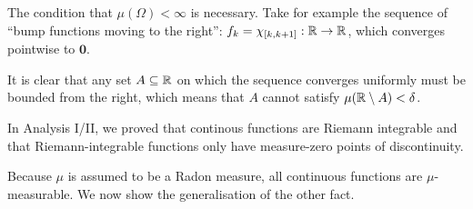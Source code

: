\begin{rem}[] \label{rem:egoroff-finite-necessary}
  The condition that $\mu(\Omega) < \infty$ is necessary.
Take for example the sequence of ``bump functions moving to the right'':
$f_k = \chi_{[k,k+1]}:\mathbb{R} \to \mathbb{R}$, which converges pointwise to $\bm{0}$.

It is clear that any set $A \subseteq \mathbb{R}$ on which the sequence converges uniformly must be bounded from the right, which means that $A$ cannot satisfy $\mu(\mathbb{R} \setminus A) < \delta$.
\end{rem}

In Analysis I/II, we proved that continous functions are Riemann integrable and that Riemann-integrable functions only have measure-zero points of discontinuity.

Because $\mu$ is assumed to be a Radon measure, all continuous functions are $\mu$-measurable.
We now show the generalisation of the other fact.

